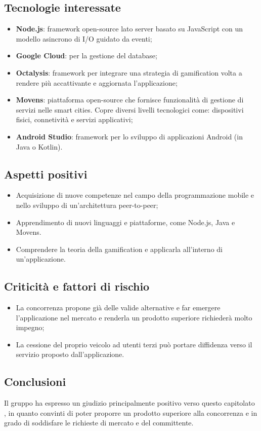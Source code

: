 \subsection{Tecnologie interessate}
\begin{itemize}
	\item \textbf{Node.js\glo}: framework\glo{} open-source lato server basato su JavaScript con un modello asincrono di I/O guidato da eventi;
	\item \textbf{Google Cloud}: per la gestione del database;
	\item \textbf{Octalysis}: framework\glo{} per integrare una strategia di gamification\glo{} volta a rendere più accattivante e aggiornata l'applicazione;
	\item \textbf{Movens}: piattaforma open-source\glo{} che fornisce funzionalità di gestione di servizi nelle smart cities. Copre diversi livelli tecnologici come: dispositivi fisici, connetività e servizi applicativi;	
	\item \textbf{Android Studio}: framework\glo{} per lo sviluppo di applicazioni Android (in Java o Kotlin).
\end{itemize}

\subsection{Aspetti positivi}
\begin{itemize}
	\item Acquisizione di nuove competenze nel campo della programmazione mobile e nello sviluppo di un'architettura peer-to-peer\glo{};
	\item Apprendimento di nuovi linguaggi e piattaforme, come Node.js, Java e Movens.
	\item Comprendere la teoria della gamification\glo{} e applicarla all'interno di un'applicazione.
	
	
\end{itemize}

\subsection{Criticità e fattori di rischio}
\begin{itemize}
	\item La concorrenza propone già delle valide alternative e far emergere l'applicazione nel mercato e renderla un prodotto superiore richiederà molto impegno;
	\item La cessione del proprio veicolo ad utenti terzi può portare diffidenza verso il servizio proposto dall'applicazione.
\end{itemize}
\subsection{Conclusioni}
Il gruppo ha espresso un giudizio principalmente positivo verso questo capitolato \glo,
in quanto convinti di poter proporre un prodotto superiore alla concorrenza e in grado di soddisfare le richieste di mercato e del committente.